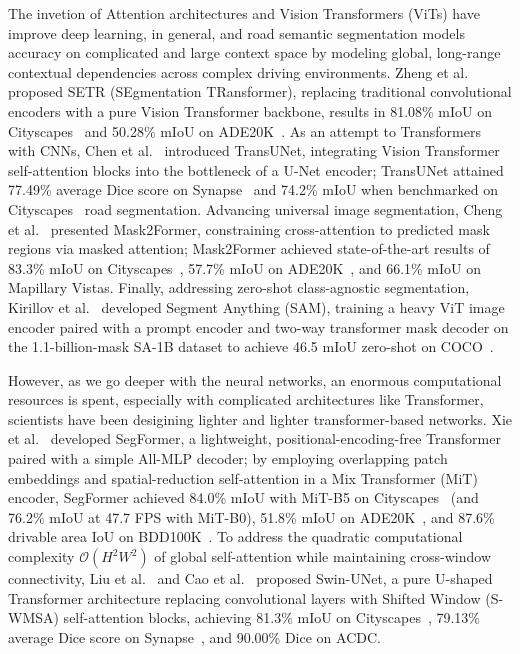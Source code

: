 \documentclass[a4paper]{report}
\begin{document}
The invetion of Attention architectures and Vision Transformers (ViTs) have improve deep learning, in general,  and road semantic segmentation models accuracy on complicated and large context space by modeling global, long-range contextual dependencies across complex driving environments. Zheng et al.~\cite{zheng2021setr} proposed SETR (SEgmentation TRansformer), replacing traditional convolutional encoders with a pure Vision Transformer backbone, results in 81.08\% mIoU on Cityscapes~\cite{cordts2016cityscapes} and 50.28\% mIoU on ADE20K~\cite{zhou2017ade20k}. As an attempt to Transformers with CNNs, Chen et al.~\cite{chen2021transunet} introduced TransUNet, integrating Vision Transformer self-attention blocks into the bottleneck of a U-Net encoder; TransUNet attained 77.49\% average Dice score on Synapse~\cite{landman2015synapse} and 74.2\% mIoU when benchmarked on Cityscapes~\cite{cordts2016cityscapes} road segmentation. 
Advancing universal image segmentation, Cheng et al.~\cite{cheng2022mask2former} presented Mask2Former, constraining cross-attention to predicted mask regions via masked attention; Mask2Former achieved state-of-the-art results of 83.3\% mIoU on Cityscapes~\cite{cordts2016cityscapes}, 57.7\% mIoU on ADE20K~\cite{zhou2017ade20k}, and 66.1\% mIoU on Mapillary Vistas. Finally, addressing zero-shot class-agnostic segmentation, Kirillov et al.~\cite{kirillov2023segment} developed Segment Anything (SAM), training a heavy ViT image encoder paired with a prompt encoder and two-way transformer mask decoder on the 1.1-billion-mask SA-1B dataset to achieve 46.5 mIoU zero-shot on COCO~\cite{lin2014coco}.

However, as we go deeper with the neural networks, an enormous computational resources is spent, especially with complicated architectures like Transformer, scientists have been desigining lighter and lighter transformer-based networks. Xie et al.~\cite{xie2021segformer} developed SegFormer, a lightweight, positional-encoding-free Transformer paired with a simple All-MLP decoder; by employing overlapping patch embeddings and spatial-reduction self-attention in a Mix Transformer (MiT) encoder, SegFormer achieved 84.0\% mIoU with MiT-B5 on Cityscapes~\cite{cordts2016cityscapes} (and 76.2\% mIoU at 47.7 FPS with MiT-B0), 51.8\% mIoU on ADE20K~\cite{zhou2017ade20k}, and 87.6\% drivable area IoU on BDD100K~\cite{bdd100k2020}. To address the quadratic computational complexity $\mathcal{O}(H^2 W^2)$ of global self-attention while maintaining cross-window connectivity, Liu et al.~\cite{liu2021swin} and Cao et al.~\cite{cao2022swinunet} proposed Swin-UNet, a pure U-shaped Transformer architecture replacing convolutional layers with Shifted Window (S-WMSA) self-attention blocks, achieving 81.3\% mIoU on Cityscapes~\cite{cordts2016cityscapes}, 79.13\% average Dice score on Synapse~\cite{landman2015synapse}, and 90.00\% Dice on ACDC. 
\end{document}
